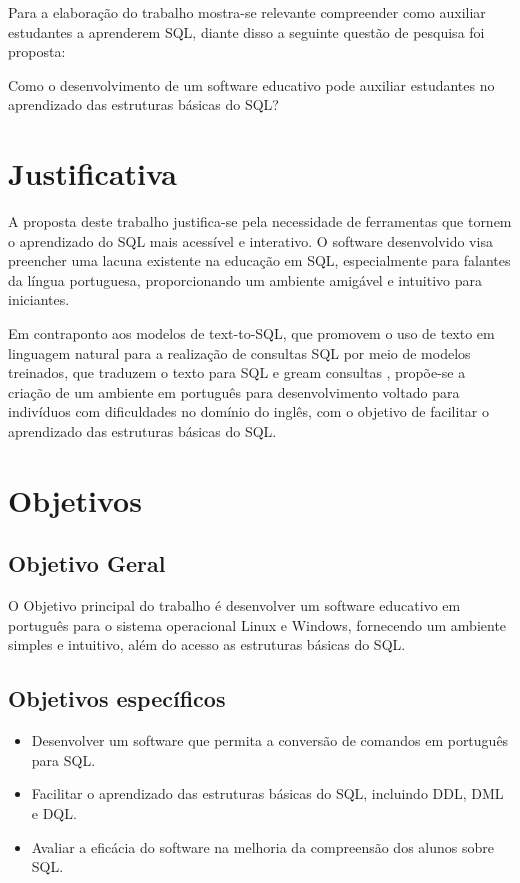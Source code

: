 Para a elaboração do trabalho mostra-se relevante compreender como auxiliar estudantes a aprenderem SQL, diante disso a seguinte questão de pesquisa foi proposta:

Como o desenvolvimento de um software educativo pode auxiliar estudantes no aprendizado das estruturas básicas do SQL?

\section{Justificativa}
A proposta deste trabalho justifica-se pela necessidade de ferramentas que tornem o aprendizado do SQL mais acessível e interativo. O software desenvolvido visa preencher uma lacuna existente na educação em SQL, especialmente para falantes da língua portuguesa, proporcionando um ambiente amigável e intuitivo para iniciantes.

Em contraponto aos modelos de text-to-SQL, que promovem o uso de texto em linguagem natural para a realização de consultas SQL por meio de modelos treinados, que traduzem o texto para SQL e gream consultas \cite{Jose2023}, propõe-se a criação de um ambiente em português para desenvolvimento voltado para indivíduos com dificuldades no domínio do inglês, com o objetivo de facilitar o aprendizado das estruturas básicas do SQL.



\section{Objetivos}
\label{sec:objetivos}

\subsection{Objetivo Geral}

O Objetivo principal do trabalho é desenvolver um software educativo em português para o sistema operacional Linux e Windows, fornecendo um ambiente simples e intuitivo, além do acesso as estruturas básicas do SQL.

\subsection{Objetivos específicos}
\begin{itemize}
    \item Desenvolver um software que permita a conversão de comandos em português para SQL.
    \item Facilitar o aprendizado das estruturas básicas do SQL, incluindo DDL, DML e DQL.
    \item Avaliar a eficácia do software na melhoria da compreensão dos alunos sobre SQL.
\end{itemize}

